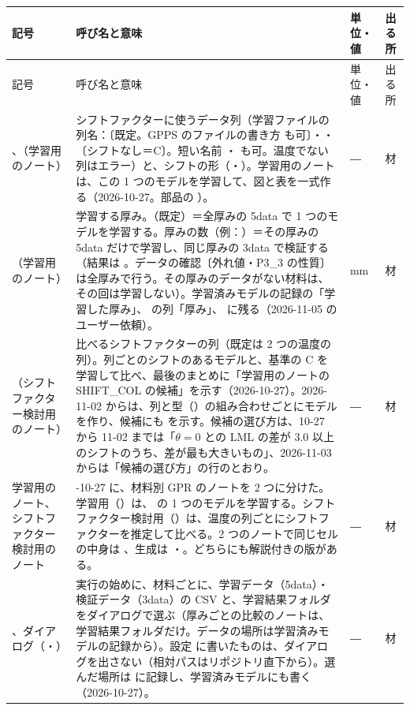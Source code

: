 \documentclass[paper=a4paper,fontsize=10.5pt,line_length=44zw,number_of_lines=38]{jlreq}
\makeatletter
\newcommand{\file}[1]{\texttt{\detokenize{#1}}}
\newenvironment{symtab}{%
  \begin{longtable}{@{}>{\raggedright\arraybackslash}p{6.5\zw}>{\raggedright\arraybackslash}p{22\zw}>{\raggedright\arraybackslash}p{6\zw}>{\raggedright\arraybackslash}p{4.5\zw}@{}}
  \toprule 記号 & 呼び名と意味 & 単位・値 & 出る所 \\ \midrule \endfirsthead
  \toprule 記号 & 呼び名と意味 & 単位・値 & 出る所 \\ \midrule \endhead
  \bottomrule \endlastfoot}{\end{longtable}}
\makeatother
\begin{document}
\begin{symtab}
\file{SHIFT_COL}、\file{SHIFT_STRUCT}（学習用のノート） & シフトファクターに使うデータ列（学習ファイルの列名：\file{"加熱シリンダ温度[℃]"}〔既定。GPPS のファイルの書き方 \file{"加熱シリンダ温度(℃)"} も可〕・\file{"流動中樹脂温度(℃)"}・\file{None}〔シフトなし＝C〕。短い名前 \file{"Tset"}・\file{"Tff"} も可。温度でない列はエラー）と、シフトの形（\file{"B"}・\file{"A"}）。学習用のノートは、この 1 つのモデルを学習して、図と表を一式作る（2026-10-27。部品の \file{shift_key}）。 & ― & 材 \\
\file{THICKNESS}（学習用のノート） & 学習する厚み。\file{None}（既定）＝全厚みの 5data で 1 つのモデルを学習する。厚みの数（例：\file{0.5}）＝その厚みの 5data だけで学習し、同じ厚みの 3data で検証する（結果は \file{<版>/厚みごと/厚み<厚み>mm/<モデルのフォルダ>/}。データの確認〔外れ値・P3\_3 の性質〕は全厚みで行う。その厚みのデータがない材料は、その回は学習しない）。学習済みモデルの記録の「学習した厚み」、\file{まとめ.csv} の列「厚み」、\file{学習した厚みのデータの概要.csv} に残る（2026-11-05 のユーザー依頼）。 & mm & 材 \\
\file{SHIFT_COLS}（シフトファクター検討用のノート） & 比べるシフトファクターの列（既定は 2 つの温度の列）。列ごとのシフトのあるモデルと、基準の C を学習して比べ、最後のまとめに「学習用のノートの SHIFT\_COL の候補」を示す（2026-10-27）。2026-11-02 からは、列と型（\file{SHIFT_FORMS}）の組み合わせごとにモデルを作り、候補にも \file{SHIFT_FORM} を示す。候補の選び方は、10-27 から 11-02 までは「$\theta=0$ との LML の差が 3.0 以上のシフトのうち、差が最も大きいもの」、2026-11-03 からは「候補の選び方」の行のとおり。 & ― & 材 \\
学習用のノート、シフトファクター検討用のノート & 2026-10-27 に、材料別 GPR のノートを 2 つに分けた。学習用（\file{材料別_温度シフトGPR_ARD対応Matern52＋線形＋ホワイトノイズ.ipynb}）は、\file{SHIFT_COL} の 1 つのモデルを学習する。シフトファクター検討用（\file{材料別_温度シフトファクターの検討_ARD対応Matern52＋線形＋ホワイトノイズ.ipynb}）は、温度の列ごとにシフトファクターを推定して比べる。2 つのノートで同じセルの中身は \file{04_補助スクリプト/mat_nb_cells.py}、生成は \file{build_mat_shift_nb.py}・\file{build_mat_shiftfactor_nb.py}。どちらにも解説付きの版がある。 & ― & 材 \\
\file{FILES}、ダイアログ（\file{choose_inputs}・\file{SOURCES}） & 実行の始めに、材料ごとに、学習データ（5data）・検証データ（3data）の CSV と、学習結果フォルダをダイアログで選ぶ（厚みごとの比較のノートは、学習結果フォルダだけ。データの場所は学習済みモデルの記録から）。設定 \file{FILES} に書いたものは、ダイアログを出さない（相対パスはリポジトリ直下から）。選んだ場所は \file{SOURCES} に記録し、学習済みモデルにも書く（2026-10-27）。 & ― & 材 \\

\end{symtab}
\end{document}
